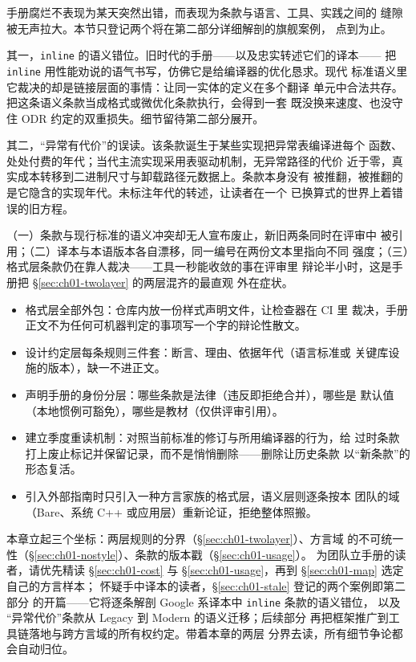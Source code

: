 \documentclass[12pt,a4paper,fontset=fandol]{ctexbook}
\newcommand{\Tp}[1]{\texttt{#1}}
\newcommand{\Lang}[1]{\textsf{#1}}
\newcommand{\CPP}{\Lang{C++}}
\newcommand{\DomGo}{\Lang{Google}}
\newcommand{\DomMod}{\Lang{Modern}}
\newcommand{\DomTra}{\Lang{Legacy}}
\newcommand{\DomBare}{\Lang{Bare}}
\begin{document}
手册腐烂不表现为某天突然出错，而表现为条款与语言、工具、实践之间的
缝隙被无声拉大。本节只登记两个将在第二部分详细解剖的旗舰案例，
点到为止。

其一，\Tp{inline} 的语义错位。旧时代的手册——以及忠实转述它们的译本——
把 \Tp{inline} 用性能劝说的语气书写，仿佛它是给编译器的优化恳求。现代
标准语义里它裁决的却是链接层面的事情：让同一实体的定义在多个翻译
单元中合法共存。把这条语义条款当成格式或微优化条款执行，会得到一套
既没换来速度、也没守住 ODR 约定的双重损失。细节留待第二部分展开。

其二，``异常有代价''的误读。该条款诞生于某些实现把异常表编译进每个
函数、处处付费的年代；当代主流实现采用表驱动机制，无异常路径的代价
近于零，真实成本转移到二进制尺寸与卸载路径元数据上。条款本身没有
被推翻，被推翻的是它隐含的实现年代。未标注年代的转述，让读者在一个
已换算式的世界上着错误的旧方程。

\begin{warning}[title={手册腐烂的三种症状}]
（一）条款与现行标准的语义冲突却无人宣布废止，新旧两条同时在评审中
被引用；（二）译本与本语版本各自漂移，同一编号在两份文本里指向不同
强度；（三）格式层条款仍在靠人裁决——工具一秒能收敛的事在评审里
辩论半小时，这是手册把 \S\ref{sec:ch01-twolayer} 的两层混齐的最直观
外在症状。
\end{warning}

\begin{bestpractice}[title={从零开始一份不会腐烂的团队手册}]
\begin{itemize}
\item 格式层全部外包：仓库内放一份样式声明文件，让检查器在 CI 里
裁决，手册正文不为任何可机器判定的事项写一个字的辩论性散文。
\item 设计约定层每条规则三件套：断言、理由、依据年代（语言标准或
关键库设施的版本），缺一不进正文。
\item 声明手册的身份分层：哪些条款是法律（违反即拒绝合并），哪些是
默认值（本地惯例可豁免），哪些是教材（仅供评审引用）。
\item 建立季度重读机制：对照当前标准的修订与所用编译器的行为，给
过时条款打上废止标记并保留记录，而不是悄悄删除——删除让历史条款
以``新条款''的形态复活。
\item 引入外部指南时只引入一种方言家族的格式层，语义层则逐条按本
团队的域（\DomBare{}、系统 \CPP{} 或应用层）重新论证，拒绝整体照搬。
\end{itemize}
\end{bestpractice}

\begin{guideline}[title={本章之后的阅读路线图}]
本章立起三个坐标：两层规则的分界（\S\ref{sec:ch01-twolayer}）、方言域
的不可统一性（\S\ref{sec:ch01-nostyle}）、条款的版本戳（\S\ref{sec:ch01-usage}）。
为团队立手册的读者，请优先精读 \S\ref{sec:ch01-cost} 与
\S\ref{sec:ch01-usage}，再到 \S\ref{sec:ch01-map} 选定自己的方言样本；
怀疑手中译本的读者，\S\ref{sec:ch01-stale} 登记的两个案例即第二部分
的开篇——它将逐条解剖 \DomGo{} 系译本中 \Tp{inline} 条款的语义错位，
以及 ``异常代价''条款从 \DomTra{} 到 \DomMod{} 的语义迁移；后续部分
再把框架推广到工具链落地与跨方言域的所有权约定。带着本章的两层
分界去读，所有细节争论都会自动归位。
\end{guideline}
\end{document}
